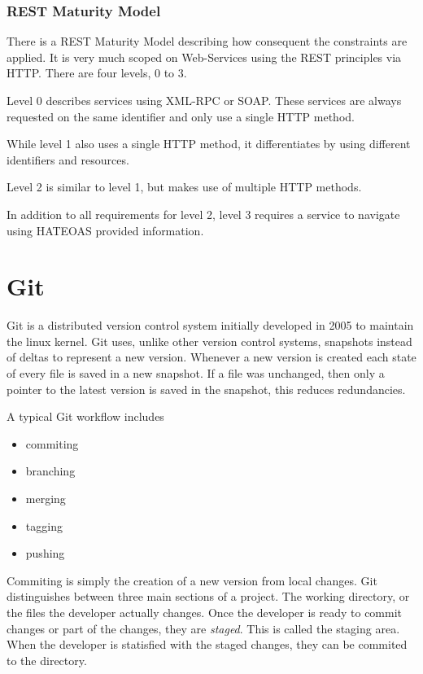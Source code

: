 \subsubsection{REST Maturity Model}

There is a REST Maturity Model describing how consequent the constraints are
applied. It is very much scoped on Web-Services using the REST principles via
HTTP. There are four levels, 0 to 3.

Level 0 describes services using XML-RPC or SOAP. These services are always
requested on the same identifier and only use a single HTTP method.

While level 1 also uses a single HTTP method, it differentiates by using
different identifiers and resources.

Level 2 is similar to level 1, but makes use of multiple HTTP methods.

In addition to all requirements for level 2, level 3 requires a service to
navigate using HATEOAS provided information.

\section{Git}

Git is a distributed version control system initially developed in 2005 to
maintain the linux kernel. Git uses, unlike other version control systems,
snapshots instead of deltas to represent a new version. Whenever a new version
is created each state of every file is saved in a new snapshot. If a file was
unchanged, then only a pointer to the latest version is saved in the snapshot,
this reduces redundancies.

A typical Git workflow includes

\begin{itemize}
  \item{commiting}
  \item{branching}
  \item{merging}
  \item{tagging}
  \item{pushing}
\end{itemize}

Commiting is simply the creation of a new version from local changes. Git
distinguishes between three main sections of a project. The working directory,
or the files the developer actually changes. Once the developer is ready to
commit changes or part of the changes, they are \textit{staged}. This is called
the staging area. When the developer is statisfied with the staged changes,
they can be commited to the directory.

